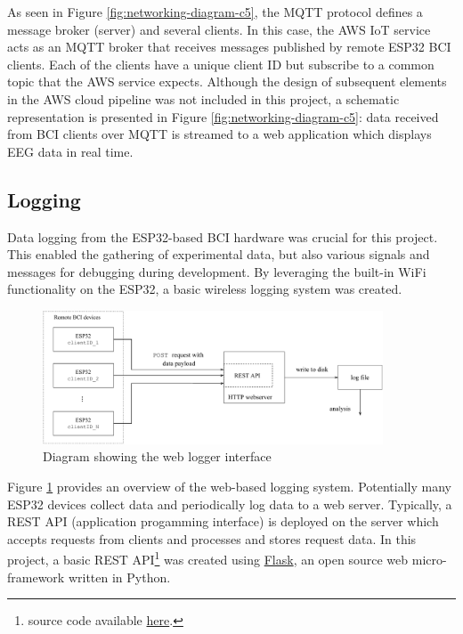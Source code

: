 As seen in Figure \ref{fig:networking-diagram-c5}, the MQTT protocol defines a message broker (server) and several clients. In this case, the AWS IoT service acts as an MQTT broker that receives messages published by remote ESP32 BCI clients. Each of the clients have a unique client ID but subscribe to a common topic that the AWS service expects. Although the design of subsequent elements in the AWS cloud pipeline was not included in this project, a schematic representation is presented in Figure \ref{fig:networking-diagram-c5}: data received from BCI clients over MQTT is streamed to a web application which displays EEG data in real time.

\subsection{Logging}
Data logging from the ESP32-based BCI hardware was crucial for this project. This enabled the gathering of experimental data, but also various signals and messages for debugging during development. By leveraging the built-in WiFi functionality on the ESP32, a basic wireless logging system was created. 

\begin{figure}[!htb]
    \centering
    \includegraphics[width=0.9\textwidth]{web-logger-diagram}
    \caption{Diagram showing the web logger interface}
    \label{fig:web-logger-c5}
\end{figure}

Figure \ref{fig:web-logger-c5} provides an overview of the web-based logging system. Potentially many ESP32 devices collect data and periodically log data to a web server. Typically, a REST API (application progamming interface) is deployed on the server which accepts requests from clients and processes and stores request data. In this project, a basic REST API\footnote{source code available \href{https://github.com/JamesTev/EEG-decoding/blob/master/eeg_lib/logging_server.py}{here}.} was created using \href{https://flask.palletsprojects.com/en/2.0.x/}{Flask}, an open source web micro-framework written in Python. 

